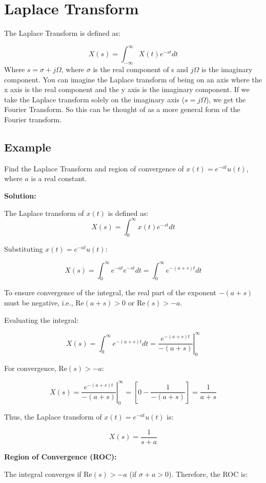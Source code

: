 \documentclass[12pt]{article}
\begin{document}
\section{Laplace Transform}

The Laplace Transform is defined as: 


\[X(s) = \int_{-\infty}^{\infty} X(t)e^{-st}dt \]
Where \(s = \sigma + j\Omega\), where \(\sigma\) is the real component of s and \(j\Omega\) is the imaginary component. You can imagine the Laplace transform of being on an axis where the x axis is the real component and the y axis is the imaginary component. If we take the Laplace transform solely on the imaginary axis (\(s = j\Omega\)), we get the Fourier Transform. So this can be thought of as a more general form of the Fourier transform.
\subsection{Example}

Find the Laplace Transform and region of convergence of \( x(t) = e^{-at}u(t) \), where \( a \) is a real constant.

\textbf{Solution:}

The Laplace transform of \( x(t) \) is defined as:
\[
X(s) = \int_{0}^{\infty} x(t) e^{-st} dt
\]

Substituting \( x(t) = e^{-at}u(t) \):

\[
X(s) = \int_{0}^{\infty} e^{-at} e^{-st} dt = \int_{0}^{\infty} e^{-(a+s)t} dt
\]

To ensure convergence of the integral, the real part of the exponent \( -(a+s) \) must be negative, i.e., \(\text{Re}(a+s) > 0\) or \(\text{Re}(s) > -a\).

Evaluating the integral:

\[
X(s) = \int_{0}^{\infty} e^{-(a+s)t} dt = \left. \frac{e^{-(a+s)t}}{-(a+s)} \right|_{0}^{\infty}
\]

For convergence, \( \text{Re}(s) > -a \):

\[
X(s) = \left. \frac{e^{-(a+s)t}}{-(a+s)} \right|_{0}^{\infty} = \left[ 0 - \frac{1}{-(a+s)} \right] = \frac{1}{a+s}
\]

Thus, the Laplace transform of \( x(t) = e^{-at}u(t) \) is:

\[
X(s) = \frac{1}{s + a}
\]

\textbf{Region of Convergence (ROC):}

The integral converges if \( \text{Re}(s) > -a \) (if \(\sigma + a > 0\)). Therefore, the ROC is:
\end{document}
